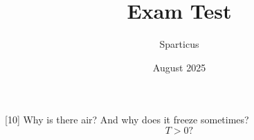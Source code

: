 \documentclass[addpoints]{exam}
\title{Exam Test}
\author{Sparticus}
\date{August 2025}
\begin{document}
\maketitle

\gradetable[v][questions]

\begin{questions}
    
[10]
Why is there air? And why does it freeze sometimes?
\[T>0\mathrm{?}\]

\end{questions}
\end{document}
